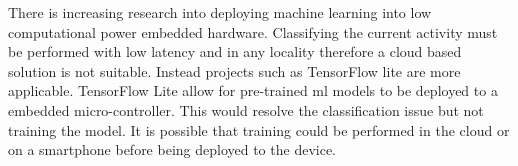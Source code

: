 There is increasing research into deploying machine learning into low computational power embedded hardware. Classifying the current activity must be performed with low latency and in any locality therefore a cloud based solution is not suitable. Instead projects such as TensorFlow lite\cite{TFLite} are more applicable. TensorFlow Lite allow for pre-trained \acrshort{ml} models to be deployed to a embedded micro-controller. This would resolve the classification issue but not training the model. It is possible that training could be performed in the cloud or on a smartphone before being deployed to the device.
